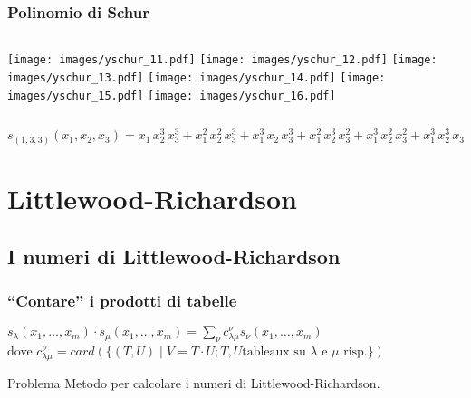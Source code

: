 \documentclass{beamer}
\begin{document}
\begin{frame}
\frametitle{Polinomio di Schur}
\begin{columns}[c]
\column{3.33cm}
\texttt{[image: images/yschur\_11.pdf]}
\vspace{0.5cm}
\texttt{[image: images/yschur\_12.pdf]}
\column{3.33cm}
\texttt{[image: images/yschur\_13.pdf]}
\vspace{0.5cm}
\texttt{[image: images/yschur\_14.pdf]}
\column{3.33cm}
\texttt{[image: images/yschur\_15.pdf]}
\vspace{0.5cm}
\texttt{[image: images/yschur\_16.pdf]}
\end{columns}
\vspace{0.5cm}
\Large$s_{(1,3,3)}(x_1,x_2,x_3)=x_{1}\,x_{2}^3\,x_{3}^3+x_{1}^2\,x_{2}^2\,x_{3}^3+x_{1}^3\,x_{2}\,x_{3}^3+x_{1}^2\,x_{2}^3\,x_{3}^2+x_{1}^3\,x_{2}^2\,x_{3}^2+x_{1}^3\,x_{2}^3\,x_{3}$
\end{frame}

\section{Littlewood-Richardson}

\subsection{I numeri di Littlewood-Richardson}

\begin{frame}
\frametitle{``Contare'' i prodotti di tabelle}
\begin{block}{}
$s_{\lambda}(x_1,\ldots,x_m) \cdot s_{\mu}(x_1,\ldots,x_m) =
\sum\limits_{\nu} c_{\lambda \mu}^{\nu} s_{\nu}(x_1,\ldots,x_m)$\\
dove $c_{\lambda \mu}^\nu=card\left(\{ (T,U) \mid V = T \cdot U; T,U \text{
  tableaux su } \lambda \text{ e } \mu \text{ risp.}\}\right)$
\end{block}
\vspace{1cm}
\begin{block}{Problema}
Metodo per calcolare i numeri di Littlewood-Richardson.
\end{block}
\end{frame}
\end{document}
